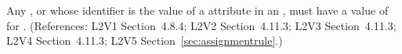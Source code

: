Any \Compartment, \Species or \Parameter whose identifier is the value of a
 attribute in an \AssignmentRule, must have a value of
 for .  (References: L2V1 Section~4.8.4; L2V2
Section~4.11.3; L2V3 Section~4.11.3; L2V4 Section~4.11.3; L2V5 Section~\ref{sec:assignmentrule}.)
